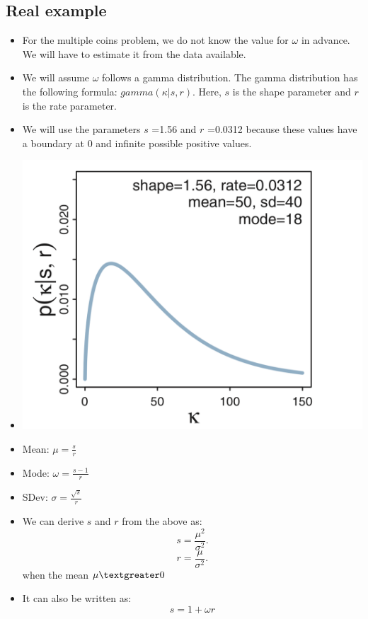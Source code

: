 \documentclass{article}
\begin{document}
    \subsection{Real example}
    \begin{itemize}
        \item For the multiple coins problem, we do not know the value for $\omega$ in advance. We will have to estimate it from the data available.
        \item We will assume $\omega$ follows a gamma distribution. The gamma distribution has the following formula: $gamma(\kappa|s, r)$. Here, $s$ is the shape parameter and $r$ is the rate parameter. 
        \item We will use the parameters $s$ =1.56 and $r$ =0.0312 because these values have a boundary at 0 and infinite possible positive values.  
        \item \includegraphics[scale=0.3]{gamma_distribution}
        \item Mean: $\mu = \frac{s}{r}$ 
        \item Mode: $\omega = \frac{s-1}{r}$
        \item SDev: $\sigma = \frac{\sqrt{s}}{r}$
        \item We can derive $s$ and $r$ from the above as:
            \[
            s = \frac{\mu^2}{\sigma^2} 
            .\] 
            \[
            r = \frac{\mu}{\sigma^2}
            .\] 
        when the mean $\mu \textgreater 0$
        \item It can also be written as:
            \[
            s = 1 + \omega r
\]
\end{itemize}
\end{document}
